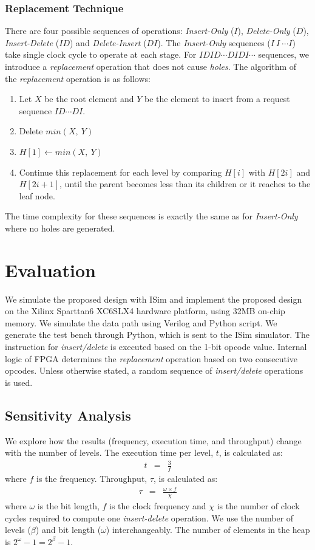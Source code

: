 \documentclass[10pt, conference, compsocconf]{IEEEtran}
\begin{document}
\subsubsection{Replacement Technique}
 There are four possible sequences of operations: {\it Insert-Only} ($I$), {\it Delete-Only} ($D$), {\it Insert-Delete} ($ID$) and {\it Delete-Insert} ($DI$).
The {\it Insert-Only} sequences ($I \ I \ \cdots I $) take single clock cycle to operate at each stage.
For $IDID \cdots DIDI \cdots$ sequences, we introduce a {\it replacement} operation that does not cause {\it holes}.
The algorithm of the {\it replacement} operation is as follows:
 \begin{enumerate}
 \item Let $X$ be the root element and $Y$ be the element to insert from a request sequence $ID \cdots DI$.
 \item Delete $min(X, \ Y)$
 \item $H[1] \leftarrow min(X,\ Y)$
 \item Continue this replacement for each level by comparing $H[i]$ with $H[2i]$ and $H[2i+1]$, until the parent becomes less than its children or it reaches to the leaf node.
 \end{enumerate}
The time complexity for these sequences is exactly the same as for {\it Insert-Only} where no holes are generated.

\section{Evaluation}

We simulate the proposed design with ISim and implement the proposed design on the Xilinx Sparttan6 XC6SLX4 hardware platform, using 32MB on-chip memory.
We simulate the data path using Verilog and Python script. 
We generate the test bench through Python, which is sent to the ISim simulator.
The instruction for {\it insert/delete} is executed based on the 1-bit opcode value.
Internal logic of FPGA determines the {\it replacement} operation based on two consecutive opcodes.
Unless otherwise stated, a random sequence of {\it insert/delete} operations is used.

\subsection{Sensitivity Analysis}

We explore how the results (frequency, execution time, and throughput) change with the number of levels.
The execution time per level, $t$, is calculated as:
\begin{eqnarray}
t &=&  \frac{3}{f}
\end{eqnarray}
where $f$ is the frequency.
Throughput, $\tau$, is calculated as:
\begin{eqnarray}
\tau &=&  \frac{\omega \times  f}{\chi}
\end{eqnarray}
 where $\omega$ is the bit length, $f$ is the clock frequency and $\chi$ is the number of clock cycles required to compute one {\it insert-delete} operation.
We use the number of levels ($\beta$) and bit length ($\omega$) interchangeably.
The number of elements in the heap is $2^\omega-1 = 2^\beta -1$.
\end{document}

